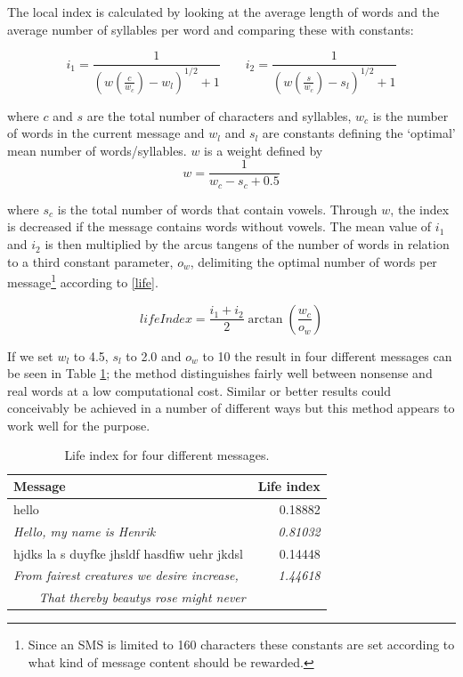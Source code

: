 The local index is calculated by looking at the average length of words and the average number of syllables per word and comparing these with constants: 

\begin{equation}\label{index}
i_1=\frac{1}{(w(\frac{c}{w_c})-w_l)^{1/2}+1} \qquad i_2=\frac{1}{(w(\frac{s}{w_c})-s_l)^{1/2}+1}
\end{equation}

where $c$ and $s$ are the total number of characters and syllables, $w_c$ is the number of words in the current message and $w_l$ and $s_l$ are constants defining the `optimal' mean number of words/syllables. $w$ is a weight defined by 
\begin{equation}
w=\frac{1}{w_c-s_c+0.5}
\end{equation}

where $s_c$ is the total number of words that contain vowels. Through $w$, the index is decreased if the message contains words without vowels. The mean value of $i_1$ and $i_2$ is then multiplied by the arcus tangens of the number of words in relation to a third constant parameter, $o_w$, delimiting the optimal number of words per message\footnote{Since an SMS is limited to 160 characters these   constants are set according to what kind of message content should   be rewarded.} according to \eqref{life}.

\begin{equation} \label{life}
lifeIndex = \frac{i_1+i_2}{2}{\arctan (\frac{w_c}{o_w})}
\end{equation}

If we set $w_l$ to 4.5, $s_l$ to 2.0 and $o_w$ to 10 the result in four different messages can be seen in Table \ref{result}; the method distinguishes fairly well between nonsense and real words at a low computational cost. Similar or better results could conceivably be achieved in a number of different ways but this method appears to work well for the purpose.

  \begin{table}[!tbp]
    \begin{center}
      \begin{tabular}{l|r}
        \hline
        \textbf{Message} & \textbf{Life index} \\
        \hline
        \small{hello} & 0.18882 \\
        \hline
        \small{\textit{Hello, my name is Henrik}} & \textit{0.81032} \\
        \hline
        \small{hjdks la s duyfke jhsldf hasdfiw uehr jkdsl} & 0.14448 \\
        \hline
        \small{\textit{From fairest creatures we desire increase,}} & \textit{1.44618} \\
        \small{\textit{\ \ \ \ That thereby beautys rose might never}} & \\
        \hline
      \end{tabular}
      \caption{Life index for four different messages.} \label{result}
    \end{center}
  \end{table}

